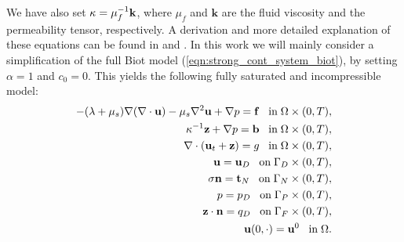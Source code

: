 \begin{table}[H]
\begin{center}
\end{center}
\caption{Poroelasticity parameters.} 
\label{tab:parameters}
\end{table}
\noindent We have also set $\mathbf{\kappa}= \mu_{f}^{-1}\mathbf{k}$, where $\mu_{f}$ and $\mathbf{k}$ are the fluid viscosity and the permeability tensor, respectively. A derivation and more detailed explanation of these equations can be found in \citet{phillips2007coupling} and \citet{showalter2000diffusion}. In this work we will mainly consider a simplification of the full Biot model (\ref{eqn:strong_cont_system_biot}), by setting $\alpha=1$ and $c_{0}=0$. This yields the following fully saturated and incompressible model: 
\begin{subequations}
\begin{align}
\label{eqn:strong_mixture_momentum_simple}
-(\lambda+\mu_{s}) \nabla (\nabla\cdot\mathbf{u})-\mu_{s} \nabla^{2} \mathbf{u} + \nabla p = \mathbf{f} \;\;\; \mbox{in}\; \Omega\times (0,T),\\
{\mathbf{\kappa}^{-1}\mathbf{z}} + \nabla p =  \mathbf{b} \;\;\; \mbox{in}\; \Omega\times (0,T),\\
\nabla \cdot (\mathbf{u}_{t} + \mathbf{z} )  = g   \;\;\; \mbox{in}\; \Omega\times (0,T),
\\
\mathbf{u} =\mathbf{u}_{D}   \;\;\; \mbox{on}\; \Gamma_{D}\times (0,T),
\\
\mathbf{\sigma}\mathbf{n} = \mathbf{t}_{N}   \;\;\; \mbox{on}\; \Gamma_{N}\times (0,T),
\\
p = p_{D}   \;\;\; \mbox{on}\; \Gamma_{P}\times (0,T),
\\
\mathbf{z} \cdot \mathbf{n} = {q_{D}}   \;\;\; \mbox{on}\; \Gamma_{F}\times (0,T),
\\
\mathbf{u}(0,\cdot) = \mathbf{u}^{0}  \;\;\;  \mbox{in}\;\Omega.
\end{align}
\label{strong_cont_system}
\end{subequations}

